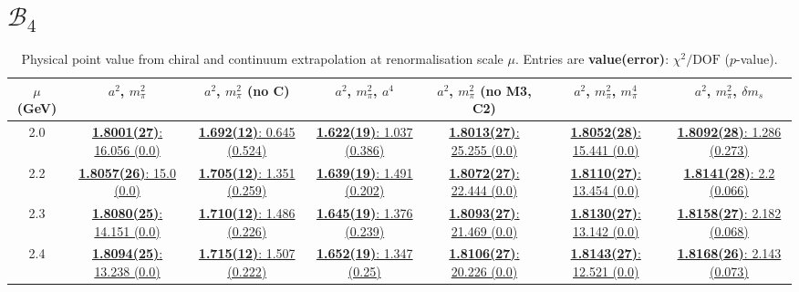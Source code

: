 \documentclass[12pt]{extarticle}
\begin{document}
\section{$\mathcal{B}_4$}
\begin{table}[h!]
\begin{center}
\begin{tabular}{|c|c|c|c|c|c|c|}
\hline
$\mu$ (GeV) & $a^2$, $m_\pi^2$& $a^2$, $m_\pi^2$ (no C)& $a^2$, $m_\pi^2$, $a^4$& $a^2$, $m_\pi^2$ (no M3, C2)& $a^2$, $m_\pi^2$, $m_\pi^4$& $a^2$, $m_\pi^2$, $\delta m_s$\\
\hline
2.0& \hyperlink{SSpPP/SUSY/bag_a2m2_20.pdf.1}{\textbf{1.8001(27)}: 16.056 (0.0)} & \hyperlink{SSpPP/SUSY/bag_a2m2noC_20.pdf.1}{\textbf{1.692(12)}: 0.645 (0.524)} & \hyperlink{SSpPP/SUSY/bag_a2a4m2_20.pdf.1}{\textbf{1.622(19)}: 1.037 (0.386)} & \hyperlink{SSpPP/SUSY/bag_a2m2mcut_20.pdf.1}{\textbf{1.8013(27)}: 25.255 (0.0)} & \hyperlink{SSpPP/SUSY/bag_a2m2m4_20.pdf.1}{\textbf{1.8052(28)}: 15.441 (0.0)} & \hyperlink{SSpPP/SUSY/bag_a2m2delm_20.pdf.1}{\textbf{1.8092(28)}: 1.286 (0.273)}\\
2.2& \hyperlink{SSpPP/SUSY/bag_a2m2_22.pdf.1}{\textbf{1.8057(26)}: 15.0 (0.0)} & \hyperlink{SSpPP/SUSY/bag_a2m2noC_22.pdf.1}{\textbf{1.705(12)}: 1.351 (0.259)} & \hyperlink{SSpPP/SUSY/bag_a2a4m2_22.pdf.1}{\textbf{1.639(19)}: 1.491 (0.202)} & \hyperlink{SSpPP/SUSY/bag_a2m2mcut_22.pdf.1}{\textbf{1.8072(27)}: 22.444 (0.0)} & \hyperlink{SSpPP/SUSY/bag_a2m2m4_22.pdf.1}{\textbf{1.8110(27)}: 13.454 (0.0)} & \hyperlink{SSpPP/SUSY/bag_a2m2delm_22.pdf.1}{\textbf{1.8141(28)}: 2.2 (0.066)}\\
2.3& \hyperlink{SSpPP/SUSY/bag_a2m2_23.pdf.1}{\textbf{1.8080(25)}: 14.151 (0.0)} & \hyperlink{SSpPP/SUSY/bag_a2m2noC_23.pdf.1}{\textbf{1.710(12)}: 1.486 (0.226)} & \hyperlink{SSpPP/SUSY/bag_a2a4m2_23.pdf.1}{\textbf{1.645(19)}: 1.376 (0.239)} & \hyperlink{SSpPP/SUSY/bag_a2m2mcut_23.pdf.1}{\textbf{1.8093(27)}: 21.469 (0.0)} & \hyperlink{SSpPP/SUSY/bag_a2m2m4_23.pdf.1}{\textbf{1.8130(27)}: 13.142 (0.0)} & \hyperlink{SSpPP/SUSY/bag_a2m2delm_23.pdf.1}{\textbf{1.8158(27)}: 2.182 (0.068)}\\
2.4& \hyperlink{SSpPP/SUSY/bag_a2m2_24.pdf.1}{\textbf{1.8094(25)}: 13.238 (0.0)} & \hyperlink{SSpPP/SUSY/bag_a2m2noC_24.pdf.1}{\textbf{1.715(12)}: 1.507 (0.222)} & \hyperlink{SSpPP/SUSY/bag_a2a4m2_24.pdf.1}{\textbf{1.652(19)}: 1.347 (0.25)} & \hyperlink{SSpPP/SUSY/bag_a2m2mcut_24.pdf.1}{\textbf{1.8106(27)}: 20.226 (0.0)} & \hyperlink{SSpPP/SUSY/bag_a2m2m4_24.pdf.1}{\textbf{1.8143(27)}: 12.521 (0.0)} & \hyperlink{SSpPP/SUSY/bag_a2m2delm_24.pdf.1}{\textbf{1.8168(26)}: 2.143 (0.073)}\\
\hline
\end{tabular}
\caption{Physical point value from chiral and continuum extrapolation at renormalisation scale $\mu$. Entries are \textbf{value(error)}: $\chi^2/\text{DOF}$ ($p$-value).}
\end{center}
\end{table}
\end{document}
